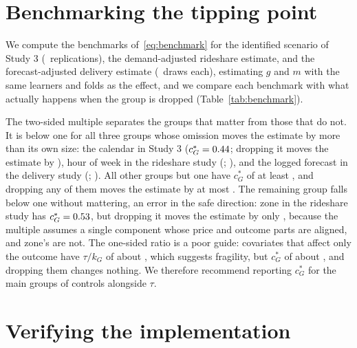 \documentclass[11pt]{article}
\theoremstyle{remark}
\begin{document}
\section{Benchmarking the tipping point}
\label{sec:benchmark}

We compute the benchmarks of~\eqref{eq:benchmark} for the identified scenario of Study 3 (\BenchReps\ replications), the demand-adjusted rideshare estimate, and the forecast-adjusted delivery estimate (\BenchDraws\ draws each), estimating $g$ and $m$ with the same learners and folds as the effect, and we compare each benchmark with what actually happens when the group is dropped (Table~\ref{tab:benchmark}).

\begin{table}[!htbp]
\caption{Benchmarking the tipping point. $k_G$ and $t_G$ are a group's outcome-side and price-side strength beyond the other controls; $\tau / k_G$ is the one-sided worst case and $c^\ast_G$ the two-sided multiple~\eqref{eq:benchmark}; the last column is the change in the estimate, relative to the estimate, when the group is dropped. Means over replications, except medians for $c^\ast_G$ and the shift.}
\label{tab:benchmark}
\centering
\small

\end{table}

The two-sided multiple separates the groups that matter from those that do not. It is below one for all three groups whose omission moves the estimate by more than its own size: the calendar in Study 3 ($c^\ast_G = 0.44$; dropping it moves the estimate by \BenchCalShift), hour of week in the rideshare study (\BenchHowC; \BenchHowShift), and the logged forecast in the delivery study (\BenchFcC; \BenchFcShift). All other groups but one have $c^\ast_G$ of at least \BenchSafeCMin, and dropping any of them moves the estimate by at most \BenchSafeShiftMax. The remaining group falls below one without mattering, an error in the safe direction: zone in the rideshare study has $c^\ast_G = 0.53$, but dropping it moves the estimate by only \BenchZoneShift, because the multiple assumes a single component whose price and outcome parts are aligned, and zone's are not. The one-sided ratio is a poor guide: covariates that affect only the outcome have $\tau / k_G$ of about \BenchOutOnlyRatio, which suggests fragility, but $c^\ast_G$ of about \BenchOutOnlyC, and dropping them changes nothing. We therefore recommend reporting $c^\ast_G$ for the main groups of controls alongside $\tau$.

\section{Verifying the implementation}
\label{sec:doubleml}
\end{document}

